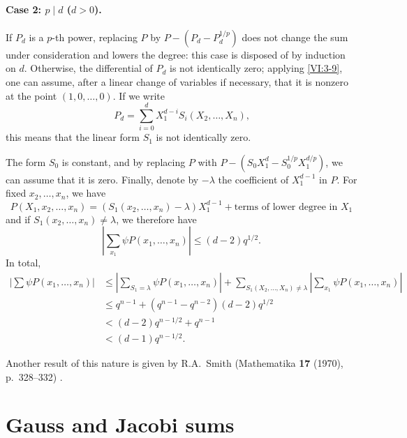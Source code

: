 \paragraph{Case 2: $p\mid d$ ($d>0$).}
If $P_d$ is a $p$-th power, replacing $P$ by $P-(P_d-P_d^{1/p})$ 
does not change the sum under consideration and lowers the degree: this case 
is disposed of by induction on $d$. Otherwise, the differential of 
$P_d$ is not identically zero; applying \ref{VI:3-9}, one can assume, 
after a linear change of variables if necessary, that it is nonzero 
at the point $(1,0,\dots,0)$. If we write 
\[
  P_d = \sum_{i=0}^d X_1^{d-i} S_i(X_2,\dots,X_n) \text{,} 
\]
this means that the linear form $S_1$ is not identically zero. 

The form $S_0$ is constant, and by replacing $P$ with 
$P-(S_0 X_1^d -S_0^{1/p} X_1^{d/p})$, we can assume that it is zero. 
Finally, denote by $-\lambda$ the coefficient of $X_1^{d-1}$ in $P$. For fixed 
$x_2,\dots,x_n$, we have 
\[
  P(X_1,x_2,\dots,x_n) = (S_1(x_2,\dots,x_n)-\lambda) X_1^{d-1} + \text{terms of lower degree in $X_1$} 
\]
and if $S_1(x_2,\dots,x_n)\ne \lambda$, we therefore have 
\[
  \left| \sum_{x_1} \psi P(x_1,\dots,x_n)\right| \leqslant (d-2) q^{1/2} \text{.} 
\]
In total, 
\begin{align*}
  \left|\sum \psi P(x_1,\dots,x_n)\right| 
    &\leqslant \left|\sum_{S_1=\lambda} \psi P(x_1,\dots,x_n)\right| + \sum_{S_1(X_2,\dots,X_n)\ne\lambda} \left| \sum_{x_1} \psi P(x_1,\dots,x_n)\right| \\
    &\leqslant q^{n-1} + (q^{n-1}-q^{n-2})(d-2) q^{1/2} \\
    &< (d-2) q^{n-1/2} + q^{n-1} \\
    &< (d-1) q^{n-1/2} \text{.}
\end{align*}

Another result of this nature is given by R.A.\ Smith 
(Mathematika \textbf{17} (1970), p.~328--332) \cite{sm70}. 










\section{Gauss and Jacobi sums}\label{VI:4}





\subsection{}\label{VI:4-1}

